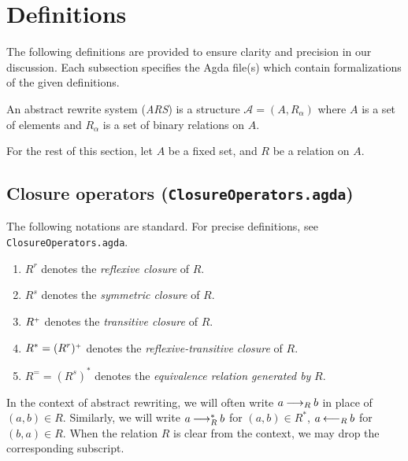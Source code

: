 \section{Definitions}
\label{sec:Definitions}
The following definitions are provided to ensure clarity and precision
in our discussion. Each subsection specifies the Agda file(s) which contain formalizations of the given definitions.

\begin{definition}
    An abstract rewrite system (\emph{ARS}) is a structure $\mathcal{A} = (A, R_\alpha)$ where
     $A$ is a set of elements and $R_\alpha$ is a set of binary relations on $A$.
\end{definition}

For the rest of this section, let $A$ be a fixed set, and $R$ be a relation on $A$.



\subsection{Closure operators (\texttt{ClosureOperators.agda})}

\begin{notation} \hfill
    
The following notations are standard.  For precise definitions, see \texttt{ClosureOperators.agda}.
  \begin{enumerate}
    \item $R^r$ denotes the \emph{reflexive closure} of $R$.
    \item $R^s$ denotes the \emph{symmetric closure} of $R$.
    \item ${R}^{\scriptscriptstyle{+}}$ denotes the \emph{transitive closure} of $R$.
    \item $R^* = (R^r){}^{\scriptscriptstyle{+}}$ denotes the \emph{reflexive-transitive closure} of $R$.
    \item $R^= = (R^s)^*$ denotes the \emph{equivalence relation generated by} $R$.
  \end{enumerate}
\end{notation}




In the context of abstract rewriting, we will often write $a \mathbin{\longrightarrow_R} b$
in place of $(a,b) \in R$.  Similarly, we will write $a \mathbin{\longrightarrow_R^*} b$ for $(a,b) \in R^*$,
$a \mathbin{\longleftarrow_R} b$ for $(b,a) \in R$.  When the relation $R$ is clear from the context,
we may drop the corresponding subscript.

